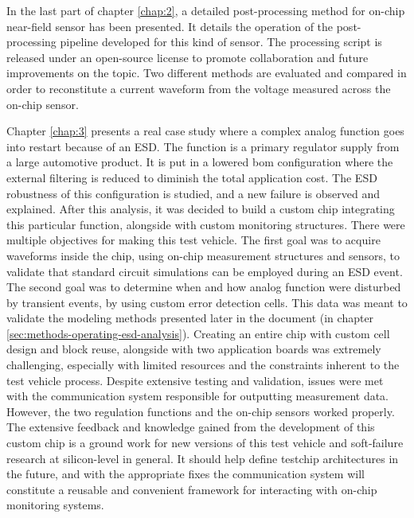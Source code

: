 In the last part of chapter \ref{chap:2}, a detailed post-processing method for on-chip near-field sensor has been presented.
It details the operation of the post-processing pipeline developed for this kind of sensor.
The processing script is released \cite{nfs-repository} under an open-source license to promote collaboration and future improvements on the topic.
Two different methods are evaluated and compared in order to reconstitute a current waveform from the voltage measured across the on-chip sensor.

Chapter \ref{chap:3} presents a real case study where a complex analog function goes into restart because of an ESD.
The function is a primary regulator supply from a large automotive product.
It is put in a lowered \gls{bom} configuration where the external filtering is reduced to diminish the total application cost.
The ESD robustness of this configuration is studied, and a new failure is observed and explained.
After this analysis, it was decided to build a custom chip integrating this particular function, alongside with custom monitoring structures.
There were multiple objectives for making this test vehicle.
The first goal was to acquire waveforms inside the chip, using on-chip measurement structures and sensors, to validate that standard circuit simulations can be employed during an ESD event.
The second goal was to determine when and how analog function were disturbed by transient events, by using custom error detection cells.
This data was meant to validate the modeling methods presented later in the document (in chapter \ref{sec:methods-operating-esd-analysis}).
Creating an entire chip with custom cell design and block reuse, alongside with two application boards was extremely challenging, especially with limited resources and the constraints inherent to the test vehicle process.
Despite extensive testing and validation, issues were met with the communication system responsible for outputting measurement data.
However, the two regulation functions and the on-chip sensors worked properly.
The extensive feedback and knowledge gained from the development of this custom chip is a ground work for new versions of this test vehicle and soft-failure research at silicon-level in general.
It should help define testchip architectures in the future, and with the appropriate fixes the communication system will constitute a reusable and convenient framework for interacting with on-chip monitoring systems.

